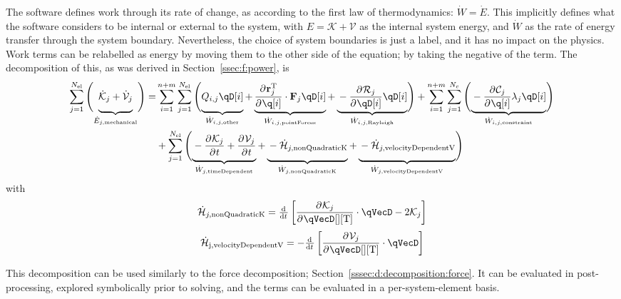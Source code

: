 \documentclass[11pt]{article}
\renewcommand{\secref}[1]{Section~\ref{#1}}
\newcommand{\pD}[2]{
    \frac{\partial\mspace{1mu}#1}{\partial\mspace{1mu}#2}
}
\newcommand{\underbraceA}[1]{
    \underbrace{\vphantom{\pD{\q}{\q}}#1}
}
\begin{document}
The software defines work through its rate of change, as according to the first law of thermodynamics: $\dot{W}=\dot{E}$. This implicitly defines what the software considers to be internal or external to the system, with $E=\mathcal{K} + \mathcal{V}$ as the internal system energy, and $\dot{W}$ as the rate of energy transfer through the system boundary. Nevertheless, the choice of system boundaries is just a label, and it has no impact on the physics. Work terms can be relabelled as energy by moving them to the other side of the equation; by taking the negative of the term. The decomposition of this, as was derived in \secref{ssec:f:power}, is
\begin{align}
    \sum_{j=1}^{N_\mathrm{el}}\del[4]{
        \underbraceA{
            \dot{\mathcal{K}}_j
            + \dot{\mathcal{V}}_j
        }_{\dot{E}_{j,\mathrm{mechanical}}}
    }
    =& \sum_{i=1}^{n+m}\sum_{j=1}^{N_\mathrm{el}}\del[4]{
        \underbraceA{Q_{i,j} \qD[i]}_{\dot{W}_{i,j,\mathrm{other}}}
        + \underbraceA{\pD{\mathbf{r}_j^{\mathrm{T}}}{\q[i]} \cdot \mathbf{F}_j \qD[i]}_{\dot{W}_{i,j,\mathrm{pointForces}}}
        + \underbraceA{- \pD{\mathcal{R}_j}{\qD[i]} \qD[i]}_{\dot{W}_{i,j,\mathrm{Rayleigh}}}
    }
    + \sum_{i=1}^{n+m}\sum_{j=1}^{N_c}\del[4]{
        \underbraceA{- \pD{\mathcal{C}_j}{\q[i]} \lambda_j \qD[i]}_{\dot{W}_{i,j,\mathrm{constraint}}}
    }
\nonumber\\ &
    + \sum_{j=1}^{N_\mathrm{el}}\del[4]{
        \underbraceA{
            - \pD{\mathcal{K}_j}{t}
            + \pD{\mathcal{V}_j}{t}
        }_{\dot{W}_{j,\mathrm{timeDependent}}}
        + \underbraceA{- \dot{\mathcal{H}}_{j,\mathrm{nonQuadraticK}}}_{\dot{W}_{j,\mathrm{nonQuadraticK}}}
        + \underbraceA{- \dot{\mathcal{H}}_{j,\mathrm{velocityDependentV}}}_{\dot{W}_{j,\mathrm{velocityDependentV}}}
    }
\end{align}
with
\begin{equation}
    \dot{\mathcal{H}}_{j,\mathrm{nonQuadraticK}}
        = \od{}{t}\sbr{\pD{\mathcal{K}_j}{\qVecD[][\mathrm{T}]} \cdot \qVecD - 2\mathcal{K}_j}
\end{equation}
\begin{equation}
    \dot{\mathcal{H}}_{\mathrm{j,velocityDependentV}}
        = - \od{}{t}\sbr{\pD{\mathcal{V}_j}{\qVecD[][\mathrm{T}]} \cdot \qVecD}
\end{equation}

This decomposition can be used similarly to the force decomposition; \secref{sssec:d:decomposition:force}. It can be evaluated in post-processing, explored symbolically prior to solving, and the terms can be evaluated in a per-system-element basis.
\end{document}
